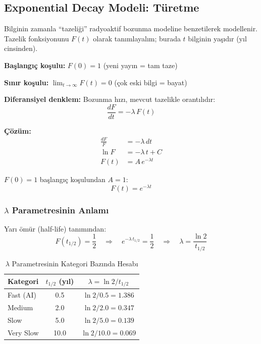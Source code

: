 \subsection{Exponential Decay Modeli: T\"{u}retme}

Bilginin zamanla ``tazeli\u{g}i'' radyoaktif bozunma modeline benzetilerek modellenir. Tazelik fonksiyonunu $F(t)$ olarak tan{\i}mlayal{\i}m; burada $t$ bilginin ya\c{s}{\i}d{\i}r (y{\i}l cinsinden).

\begin{formulbox}
\textbf{Ba\c{s}lang{\i}\c{c} ko\c{s}ulu:} $F(0) = 1$ \quad (yeni yay{\i}n = tam taze)

\textbf{S{\i}n{\i}r ko\c{s}ulu:} $\lim_{t \to \infty} F(t) = 0$ \quad (\c{c}ok eski bilgi = bayat)

\textbf{Diferansiyel denklem:} Bozunma h{\i}z{\i}, mevcut tazelikle orant{\i}l{\i}d{\i}r:
\begin{equation}
\label{eq:decay-ode}
\frac{dF}{dt} = -\lambda \, F(t)
\end{equation}

\textbf{\c{C}\"{o}z\"{u}m:}
\begin{align}
\frac{dF}{F} &= -\lambda \, dt \\
\ln F &= -\lambda \, t + C \\
F(t) &= A \, e^{-\lambda t}
\end{align}

$F(0) = 1$ ba\c{s}lang{\i}\c{c} ko\c{s}ulundan $A = 1$:
\begin{equation}
\label{eq:freshness}
\boxed{F(t) = e^{-\lambda t}}
\end{equation}
\end{formulbox}

\subsubsection{$\lambda$ Parametresinin Anlam{\i}}

Yar{\i} \"{o}m\"{u}r (half-life) tan{\i}m{\i}ndan:
\begin{equation}
\label{eq:halflife}
F(t_{1/2}) = \frac{1}{2} \quad \Longrightarrow \quad e^{-\lambda \, t_{1/2}} = \frac{1}{2} \quad \Longrightarrow \quad \lambda = \frac{\ln 2}{t_{1/2}}
\end{equation}

\begin{table}[H]
\centering
\caption{$\lambda$ Parametresinin Kategori Baz{\i}nda Hesab{\i}}
\label{tab:lambda-values}
\begin{tabular}{lcc}
\toprule
\color{chapterBlue}\textbf{Kategori} & \color{chapterBlue}\textbf{$t_{1/2}$ (y{\i}l)} & \color{chapterBlue}\textbf{$\lambda = \ln 2 / t_{1/2}$} \\
\midrule
Fast (AI)  & 0.5  & $\ln 2 / 0.5 = 1.386$ \\
Medium     & 2.0  & $\ln 2 / 2.0 = 0.347$ \\
Slow       & 5.0  & $\ln 2 / 5.0 = 0.139$ \\
Very Slow  & 10.0 & $\ln 2 / 10.0 = 0.069$ \\
\bottomrule
\end{tabular}
\end{table}

